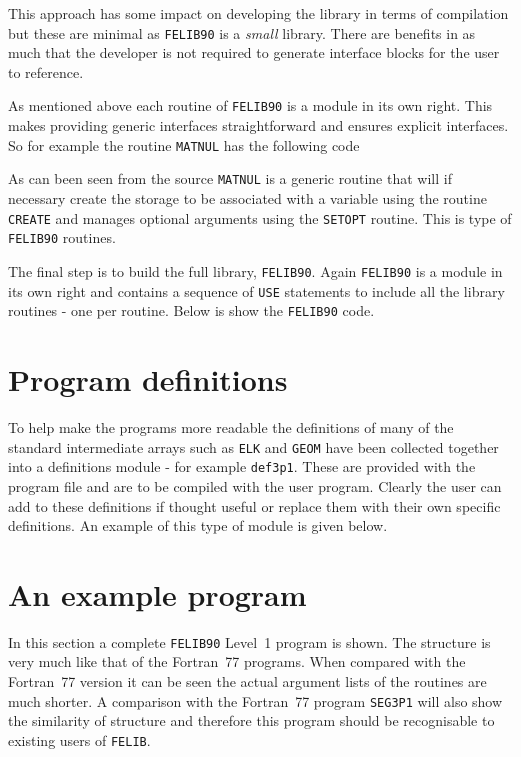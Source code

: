 \documentclass[a4paper,titlepage,11pt]{article}
\begin{document}
This approach has some impact on developing the library in terms of
compilation but these are minimal as {\tt FELIB90} is a \textit{small} library. There
are benefits in as much that the developer is not required to generate
interface blocks for the user to reference.

As mentioned above each routine of {\tt FELIB90} is a module in its own right. This
makes providing generic interfaces straightforward and ensures explicit
interfaces. So for example the routine {\tt MATNUL} has the following code
\begin{quote}
\source

\end{quote}
As can been seen from the source {\tt MATNUL} is a generic routine that will if
necessary create the storage to be associated with a variable using the routine
{\tt CREATE} and manages optional arguments using the {\tt SETOPT} routine.
This is type of {\tt FELIB90} routines.

The final step is to build the full library, {\tt FELIB90}. Again {\tt FELIB90} is a module
in its own right and contains a sequence of {\tt USE} statements to include
all the library routines - one per routine. Below is show the {\tt FELIB90} code.
\begin{quote}
\source

\end{quote}
\section{Program definitions}
\label{prog-def}
To help make the programs more readable the definitions of many of the
standard intermediate arrays such as {\tt ELK} and {\tt GEOM} have been
collected together into a definitions module - for example {\tt def3p1}.
These are provided with the program file and are to be compiled with
the user program. Clearly the user can add to these definitions if thought
useful or replace them with their own specific definitions. An example of
this type of module is given below.
\begin{quote}
\source

\end{quote}

\section{An example program}
In this section a complete {\tt FELIB90} Level~1 program is shown. The structure is
very much like that of the Fortran~77 programs. When compared with the Fortran~77
version it can be seen the actual argument lists of the routines are much shorter. 
A comparison with the Fortran~77 program {\tt  SEG3P1} \cite{felib1} will also show
the similarity of structure and therefore this program should be recognisable to 
existing users of {\tt FELIB}.
\end{document}
